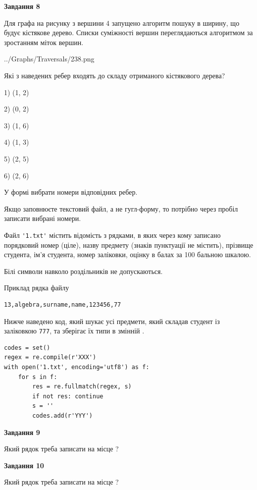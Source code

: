 \documentclass[12pt, ukrainian]{article}
\def\code#1{\Verb!#1!}
\begin{document}
{\begin {large}
{\begin {center}\textbf{Завдання 8}\end {center}}\par
Для графа на рисунку з вершини 4 запущено алгоритм пошуку в ширину, що будує кістякове дерево. Списки суміжності вершин переглядаються алгоритмом за зростанням міток вершин.\par
\begin{center}
	{../Graphs/Traversals/238.png}
\end{center}
\par Які з наведених ребер входять до складу отриманого кістякового дерева?\par
1) (1, 2)\par
2) (0, 2)\par
3) (1, 6)\par
4) (1, 3)\par
5) (2, 5)\par
6) (2, 6)\par
{\vskip 15pt} У формі вибрати номери відповідних ребер.


Якщо заповнюєте текстовий файл, а не гугл-форму, то потрібно через пробіл записа\-ти вибрані номери.\par
\newpage


Файл \code{'1.txt'} містить відомість з рядками, в яких через кому записано поряд\-ковий номер (ціле), назву предмету (знаків пунктуації не містить), прізвище студента, ім'я студента, номер заліковки, оцінку в балах за 100 бальною шкалою.

Білі символи навколо роздільників не допускаються.

Приклад рядка файлу



\begin{verbatim}
13,algebra,surname,name,123456,77
\end{verbatim}


Нижче наведено код, який шукає усі предмети, який складав студент із заліковкою \code{777}, та зберігає їх типи в змінній .



\begin{verbatim}
codes = set()
regex = re.compile(r'XXX')
with open('1.txt', encoding='utf8') as f:
    for s in f:
        res = re.fullmatch(regex, s)
        if not res: continue
        s = ''
        codes.add(r'YYY')
\end{verbatim}


{\begin {center}\textbf{Завдання 9}\end {center}}\par
Який рядок треба записати на місце  ?\par
\vspace{5mm}


{\begin {center}\textbf{Завдання 10}\end {center}}\par
Який рядок треба записати на місце  ?\par


\newpage


\end {large}}
\end{document}
